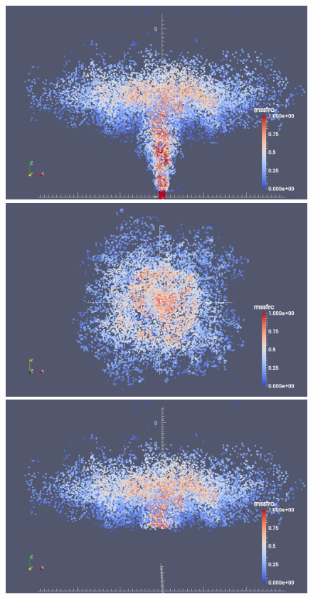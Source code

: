 \begin{figure}[!htb]
    \centering
    \begin{minipage}{.325\textwidth}
        \centering
        \includegraphics[width=0.99 \textwidth]{Chapter-7/Figures/mssfrc_front-filter-by-phase}
    \end{minipage}%
    \begin{minipage}{.325 \textwidth}
        \centering
        \includegraphics[width=0.99 \textwidth]{Chapter-7/Figures/mssfrc_top-with-axis}
    \end{minipage}%
    \begin{minipage}{.325 \textwidth}
        \centering
        \includegraphics[width=0.99 \textwidth]{Chapter-7/Figures/mssfrc_front-z15000}

\end{minipage}
\end{figure}
